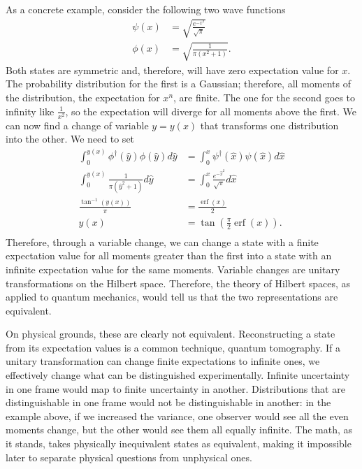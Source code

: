 \documentclass[10pt,twocolumn, nofootinbib]{revtex4-2}
\DeclareMathOperator{\erf}{erf}
\begin{document}
As a concrete example, consider the following two wave functions
\begin{align}
\psi(x) &= \sqrt{\frac{e^{-x^2}}{\sqrt{\pi}}} \\
\phi(x) &= \sqrt{\frac{1}{\pi(x^2 + 1)}}.
\end{align}
Both states are symmetric and, therefore, will have zero expectation value for $x$. The probability distribution for the first is a Gaussian; therefore, all moments of the distribution, the expectation for $x^n$, are finite. The one for the second goes to infinity like $\frac{1}{x^2}$, so the expectation will diverge for all moments above the first. We can now find a change of variable $y=y(x)$ that transforms one distribution into the other. We need to set
\begin{equation}
\begin{aligned}
\int_{0}^{y(x)} \phi^\dagger(\hat{y}) \phi(\hat{y}) d\hat{y} &= \int_{0}^{x} \psi^\dagger(\hat{x}) \psi(\hat{x}) d\hat{x} \\
\int_{0}^{y(x)} \frac{1}{\pi(\hat{y}^2 + 1)} d\hat{y} &= \int_{0}^{x} \frac{e^{-\hat{x}^2}}{\sqrt{\pi}} d\hat{x} \\
\frac{\tan^{-1}(y(x))}{\pi} &= \frac{\erf(x)}{2} \\
y(x) &= \tan \left(\frac{\pi}{2}\erf(x)\right). \\
\end{aligned}
\end{equation}
Therefore, through a variable change, we can change a state with a finite expectation value for all moments greater than the first into a state with an infinite expectation value for the same moments. Variable changes are unitary transformations on the Hilbert space. Therefore, the theory of Hilbert spaces, as applied to quantum mechanics, would tell us that the two representations are equivalent.

On physical grounds, these are clearly not equivalent. Reconstructing a state from its expectation values is a common technique, quantum tomography.\cite{banaszek2013focus} If a unitary transformation can change finite expectations to infinite ones, we effectively change what can be distinguished experimentally. Infinite uncertainty in one frame would map to finite uncertainty in another. Distributions that are distinguishable in one frame would not be distinguishable in another: in the example above, if we increased the variance, one observer would see all the even moments change, but the other would see them all equally infinite. The math, as it stands, takes physically inequivalent states as equivalent, making it impossible later to separate physical questions from unphysical ones.
\end{document}
